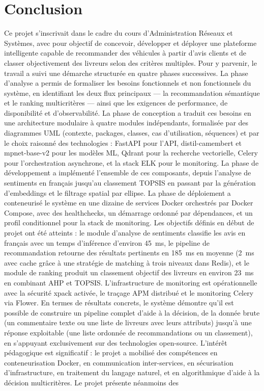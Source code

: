 
\chapter*{Conclusion}

Ce projet s'inscrivait dans le cadre du cours d'Administration Réseaux et Systèmes, avec pour objectif de concevoir, développer et déployer une plateforme intelligente capable de recommander des véhicules à partir d'avis clients et de classer objectivement des livreurs selon des critères multiples. Pour y parvenir, le travail a suivi une démarche structurée en quatre phases successives. La phase d'analyse a permis de formaliser les besoins fonctionnels et non fonctionnels du système, en identifiant les deux flux principaux --- la recommandation sémantique et le ranking multicritères --- ainsi que les exigences de performance, de disponibilité et d'observabilité. La phase de conception a traduit ces besoins en une architecture modulaire à quatre modules indépendants, formalisée par des diagrammes UML (contexte, packages, classes, cas d'utilisation, séquences) et par le choix raisonné des technologies : FastAPI pour l'API, distil-camembert et mpnet-base-v2 pour les modèles ML, Qdrant pour la recherche vectorielle, Celery pour l'orchestration asynchrone, et la stack ELK pour le monitoring. La phase de développement a implémenté l'ensemble de ces composants, depuis l'analyse de sentiments en français jusqu'au classement TOPSIS en passant par la génération d'embeddings et le filtrage spatial par ellipse. La phase de déploiement a conteneurisé le système en une dizaine de services Docker orchestrés par Docker Compose, avec des healthchecks, un démarrage ordonné par dépendances, et un profil conditionnel pour la stack de monitoring. Les objectifs définis en début de projet ont été atteints : le module d'analyse de sentiments classifie les avis en français avec un temps d'inférence d'environ 45~ms, le pipeline de recommandation retourne des résultats pertinents en 185~ms en moyenne (2~ms avec cache grâce à une stratégie de matching à trois niveaux dans Redis), et le module de ranking produit un classement objectif des livreurs en environ 23~ms en combinant AHP et TOPSIS. L'infrastructure de monitoring est opérationnelle avec la sécurité xpack activée, le traçage APM distribué et le monitoring Celery via Flower. En termes de résultats concrets, le système démontre qu'il est possible de construire un pipeline complet d'aide à la décision, de la donnée brute (un commentaire texte ou une liste de livreurs avec leurs attributs) jusqu'à une réponse exploitable (une liste ordonnée de recommandations ou un classement), en s'appuyant exclusivement sur des technologies open-source. L'intérêt pédagogique est significatif : le projet a mobilisé des compétences en conteneurisation Docker, en communication inter-services, en sécurisation d'infrastructure, en traitement du langage naturel, et en algorithmique d'aide à la décision multicritères. Le projet présente néanmoins des 